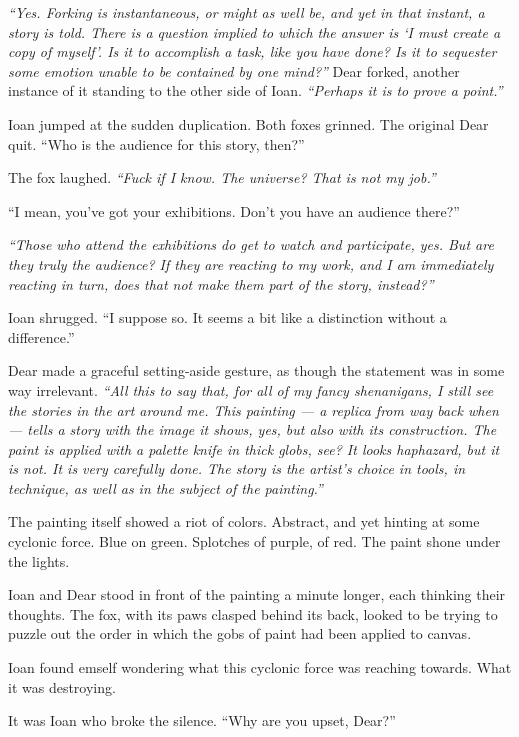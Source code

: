 \emph{``Yes. Forking is instantaneous, or might as well be, and yet in that instant, a story is told. There is a question implied to which the answer is `I must create a copy of myself'. Is it to accomplish a task, like you have done? Is it to sequester some emotion unable to be contained by one mind?''} Dear forked, another instance of it standing to the other side of Ioan. \emph{``Perhaps it is to prove a point.''}

Ioan jumped at the sudden duplication. Both foxes grinned. The original Dear quit. ``Who is the audience for this story, then?''

The fox laughed. \emph{``Fuck if I know. The universe? That is not my job.''}

``I mean, you've got your exhibitions. Don't you have an audience there?''

\emph{``Those who attend the exhibitions do get to watch and participate, yes. But are they truly the audience? If they are reacting to my work, and I am immediately reacting in turn, does that not make them part of the story, instead?''}

Ioan shrugged. ``I suppose so. It seems a bit like a distinction without a difference.''

Dear made a graceful setting-aside gesture, as though the statement was in some way irrelevant. \emph{``All this to say that, for all of my fancy shenanigans, I still see the stories in the art around me. This painting — a replica from way back when — tells a story with the image it shows, yes, but also with its construction. The paint is applied with a palette knife in thick globs, see? It looks haphazard, but it is not. It is very carefully done. The story is the artist's choice in tools, in technique, as well as in the subject of the painting.''}

The painting itself showed a riot of colors. Abstract, and yet hinting at some cyclonic force. Blue on green. Splotches of purple, of red. The paint shone under the lights.

Ioan and Dear stood in front of the painting a minute longer, each thinking their thoughts. The fox, with its paws clasped behind its back, looked to be trying to puzzle out the order in which the gobs of paint had been applied to canvas.

Ioan found emself wondering what this cyclonic force was reaching towards. What it was destroying.

It was Ioan who broke the silence. ``Why are you upset, Dear?''

